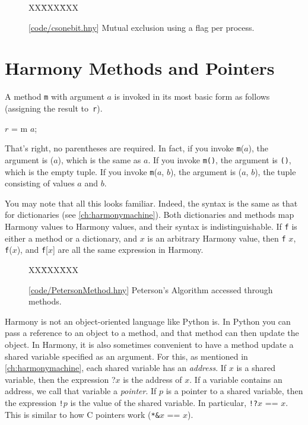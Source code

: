 \documentclass{report}
\newcommand{\harmonysource}[1]{
\begin{tabbing}
XX\=XXX\=XXX\kill
    
\end{tabbing}
}
\newcommand{\harmonylink}[1]{%
[\href{https://www.cs.cornell.edu/home/rvr/harmony/#1}{\underline{#1}}]%
}
\newenvironment{code}{
\tcolorbox
}{
\endtcolorbox
}
\begin{document}
\begin{figure}
\begin{code}
\harmonysource{csonebit}
\end{code}
\caption{\harmonylink{code/csonebit.hny} Mutual exclusion using a flag per process.}
\label{fig:csonebit}
\end{figure}

\chapter{Harmony Methods and Pointers}
\label{ch:method}
%

A method \texttt{m} with argument $a$ is invoked in its
most basic form as follows (assigning the result to~\texttt{r}).
\begin{code}
$r$ = m $a$;
\end{code}
That's right, no parentheses are required.  In fact, if you invoke
\texttt{m}($a$), the argument is ($a$), which is the same
as $a$.
If you invoke \texttt{m()}, the argument is \texttt{()},
which is the empty tuple.
If you invoke \texttt{m}($a$, $b$), the argument is ($a$, $b$),
the tuple consisting of values $a$ and $b$.

You may note that all this looks familiar.  Indeed, the syntax
is the same as that for dictionaries (see \autoref{ch:harmonymachine}).
Both dictionaries and methods map Harmony values to Harmony values,
and their syntax is indistinguishable.
If \texttt{f} is either a method or a
dictionary, and $x$ is an arbitrary Harmony value, then
\texttt{f} $x$, \texttt{f}($x$), and \texttt{f}[$x$] are all
the same expression in Harmony.

\begin{figure}
\begin{code}
\harmonysource{PetersonMethod}
\end{code}
\caption{\harmonylink{code/PetersonMethod.hny} Peterson's Algorithm accessed through methods.}
\label{fig:petersonmethods}
\end{figure}

Harmony is not an object-oriented language like Python is.  In Python
you can pass a reference to an object to a method, and that method
can then update the object.  In Harmony, it is also sometimes convenient
to have a method update a shared variable specified as an argument.
For this, as mentioned in \autoref{ch:harmonymachine},
each shared variable has an \emph{address}.
%
If $x$ is a shared variable, then the expression ?$x$ is the address of $x$.
If a variable contains an address, we call that variable a \emph{pointer}.
%
If $p$ is a pointer to a shared variable, then the
expression \texttt{!{}}$p$ is the value of the shared variable.
In particular, \texttt{!{}?}$x$ == $x$.
This is similar to how C pointers work (\texttt{*\string&}$x$ == $x$).
\end{document}
